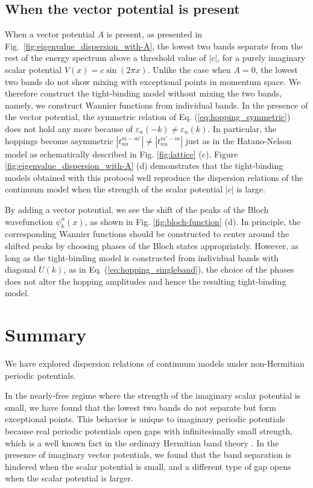 \documentclass[prb,superscriptaddress,floatfix,twocolumn,showpacs]{revtex4-2}
\begin{document}
\subsection{When the vector potential is present}
\label{subsec:imaginary-potential_with-A}
When a vector potential $A$ is present, as presented in Fig.~\ref{fig:eigenvalue_dispersion_with-A}, the lowest two bands separate from the rest of the energy spectrum above a threshold value of $|c|$, for a purely imaginary scalar potential $V(x) = c\sin (2\pi x)$. Unlike the case when $A = 0$, the lowest two bands do not show mixing with exceptional points in momentum space. We therefore construct the tight-binding model without mixing the two bands, namely, we construct Wannier functions from individual bands. 
In the presence of the vector potential, the symmetric relation of Eq. (\ref{eq:hopping_symmetric}) does not hold any more because of $\varepsilon_n(-k)\neq\varepsilon_n(k)$. 
In particular, the hoppings become asymmetric $|t_{nn}^{m-m'}| \neq |t_{nn}^{m'-m}|$ just as in the Hatano-Nelson model as schematically described in Fig. \ref{fig:lattice} (c). Figure \ref{fig:eigenvalue_dispersion_with-A} (d) demonstrates that the tight-binding models obtained with this protocol well reproduce the dispersion relations of the continuum model when the strength of the scalar potential $|c|$ is large.

By adding a vector potential, we see the shift of the peaks of the Bloch wavefunction $\psi_k^n(x)$, as shown in Fig. \ref{fig:bloch-function} (d). 
In principle, the corresponding Wannier functions should be constructed to center around the shifted peaks by choosing phases of the Bloch states appropriately. 
However, as long as the tight-binding model is constructed from individual bands with diagonal $U(k)$, as in Eq. (\ref{eq:hopping_singleband}), the choice of the phases does not alter the hopping amplitudes and hence the resulting tight-binding model.

\section{Summary}
\label{sec:summary}
We have explored dispersion relations of continuum models under non-Hermitian periodic potentials. 

In the nearly-free regime where the strength of the imaginary scalar potential is small, we have found that the lowest two bands do not separate but form exceptional points.
This behavior is unique to imaginary periodic potentials because real periodic potentials open gaps with infinitesimally small strength, which is a well known fact in the ordinary Hermitian band theory \cite{ashcroft1976solid}.
In the presence of imaginary vector potentials, we found that the band separation is hindered when the scalar potential is small, and a different type of gap opens when the scalar potential is larger. 
\end{document}
